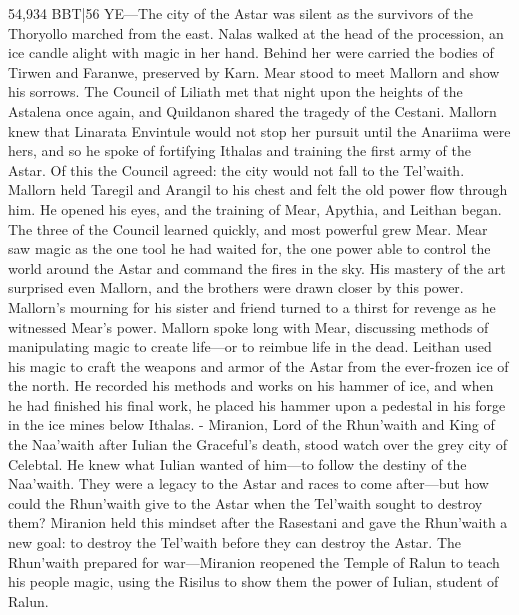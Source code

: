 \documentclass[smalldemyvopaper,11pt,twoside,onecolumn,openright,extrafontsizes]{memoir}
\begin{document}
{{54,934 BBT|56 YE—The city of the Astar was silent as the survivors of the Thoryollo marched from the east. Nalas walked at the head of the procession, an ice candle alight with magic in her hand. Behind her were carried the bodies of Tirwen and Faranwe, preserved by Karn. Mear stood to meet Mallorn and show his sorrows. The Council of Liliath met that night upon the heights of the Astalena once again, and Quildanon shared the tragedy of the Cestani. Mallorn knew that Linarata Envintule would not stop her pursuit until the Anariima were hers, and so he spoke of fortifying Ithalas and training the first army of the Astar. Of this the Council agreed: the city would not fall to the Tel’waith. Mallorn held Taregil and Arangil to his chest and felt the old power flow through him. He opened his eyes, and the training of Mear, Apythia, and Leithan began. The three of the Council learned quickly, and most powerful grew Mear. Mear saw magic as the one tool he had waited for, the one power able to control the world around the Astar and command the fires in the sky. His mastery of the art surprised even Mallorn, and the brothers were drawn closer by this power. Mallorn’s mourning for his sister and friend turned to a thirst for revenge as he witnessed Mear’s power. Mallorn spoke long with Mear, discussing methods of manipulating magic to create life—or to reimbue life in the dead. Leithan used his magic to craft the weapons and armor of the Astar from the ever-frozen ice of the north. He recorded his methods and works on his hammer of ice, and when he had finished his final work, he placed his hammer upon a pedestal in his forge in the ice mines below Ithalas.
- Miranion, Lord of the Rhun’waith and King of the Naa’waith after Iulian the Graceful’s death, stood watch over the grey city of Celebtal. He knew what Iulian wanted of him—to follow the destiny of the Naa’waith. They were a legacy to the Astar and races to come after—but how could the Rhun’waith give to the Astar when the Tel’waith sought to destroy them? Miranion held this mindset after the Rasestani and gave the Rhun’waith a new goal: to destroy the Tel’waith before they can destroy the Astar. The Rhun’waith prepared for war—Miranion reopened the Temple of Ralun to teach his people magic, using the Risilus to show them the power of Iulian, student of Ralun.

}}
\end{document}

